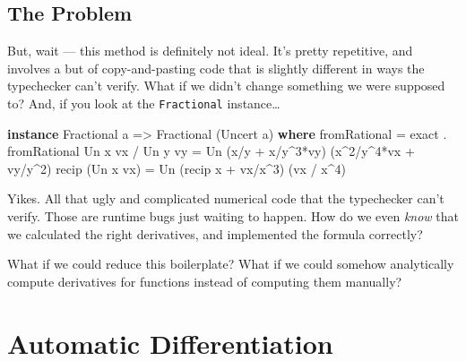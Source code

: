 \documentclass[]{article}
\newenvironment{Shaded}{}{}
\newcommand{\KeywordTok}[1]{\textcolor[rgb]{0.00,0.44,0.13}{\textbf{{#1}}}}
\newcommand{\DataTypeTok}[1]{\textcolor[rgb]{0.56,0.13,0.00}{{#1}}}
\newcommand{\DecValTok}[1]{\textcolor[rgb]{0.25,0.63,0.44}{{#1}}}
\newcommand{\OtherTok}[1]{\textcolor[rgb]{0.00,0.44,0.13}{{#1}}}
\newcommand{\FunctionTok}[1]{\textcolor[rgb]{0.02,0.16,0.49}{{#1}}}
\newcommand{\NormalTok}[1]{{#1}}
\begin{document}
\subsection{The Problem}\label{the-problem}

But, wait --- this method is definitely not ideal. It's pretty
repetitive, and involves a but of copy-and-pasting code that is slightly
different in ways the typechecker can't verify. What if we didn't change
something we were supposed to? And, if you look at the
\texttt{Fractional} instance\ldots{}

\begin{Shaded}
\begin{Highlighting}[]
\KeywordTok{instance} \DataTypeTok{Fractional} \NormalTok{a }\OtherTok{=>} \DataTypeTok{Fractional} \NormalTok{(}\DataTypeTok{Uncert} \NormalTok{a) }\KeywordTok{where}
    \NormalTok{fromRational      }\FunctionTok{=} \NormalTok{exact }\FunctionTok{.} \NormalTok{fromRational}
    \DataTypeTok{Un} \NormalTok{x vx }\FunctionTok{/} \DataTypeTok{Un} \NormalTok{y vy }\FunctionTok{=} \DataTypeTok{Un} \NormalTok{(x}\FunctionTok{/}\NormalTok{y }\FunctionTok{+} \NormalTok{x}\FunctionTok{/}\NormalTok{y}\FunctionTok{^}\DecValTok{3}\FunctionTok{*}\NormalTok{vy)   (x}\FunctionTok{^}\DecValTok{2}\FunctionTok{/}\NormalTok{y}\FunctionTok{^}\DecValTok{4}\FunctionTok{*}\NormalTok{vx }\FunctionTok{+} \NormalTok{vy}\FunctionTok{/}\NormalTok{y}\FunctionTok{^}\DecValTok{2}\NormalTok{)}
    \NormalTok{recip (}\DataTypeTok{Un} \NormalTok{x vx)   }\FunctionTok{=} \DataTypeTok{Un} \NormalTok{(recip x }\FunctionTok{+} \NormalTok{vx}\FunctionTok{/}\NormalTok{x}\FunctionTok{^}\DecValTok{3}\NormalTok{) (vx }\FunctionTok{/} \NormalTok{x}\FunctionTok{^}\DecValTok{4}\NormalTok{)}
\end{Highlighting}
\end{Shaded}

Yikes. All that ugly and complicated numerical code that the typechecker
can't verify. Those are runtime bugs just waiting to happen. How do we
even \emph{know} that we calculated the right derivatives, and
implemented the formula correctly?

What if we could reduce this boilerplate? What if we could somehow
analytically compute derivatives for functions instead of computing them
manually?

\section{Automatic Differentiation}\label{automatic-differentiation}
\end{document}

